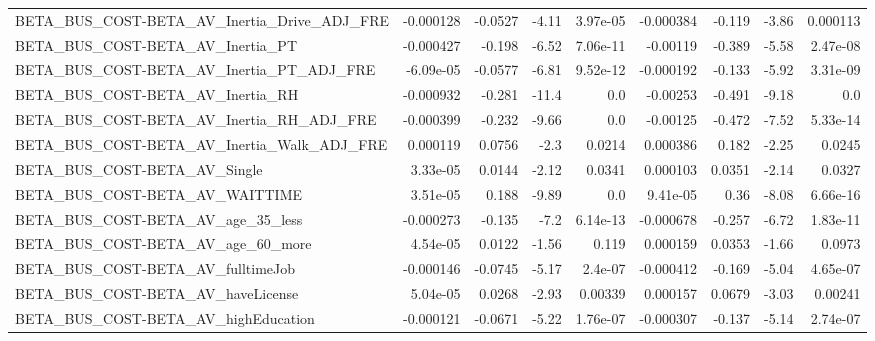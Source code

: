\begin{tabular}{lrrrrrrrr}
BETA\_BUS\_COST-BETA\_AV\_Inertia\_Drive\_ADJ\_FRE        &   -0.000128 &      -0.0527 &    -4.11 & 3.97e-05 &  -0.000384 &      -0.119 &        -3.86 &      0.000113 \\
BETA\_BUS\_COST-BETA\_AV\_Inertia\_PT                   &   -0.000427 &       -0.198 &    -6.52 & 7.06e-11 &   -0.00119 &      -0.389 &        -5.58 &      2.47e-08 \\
BETA\_BUS\_COST-BETA\_AV\_Inertia\_PT\_ADJ\_FRE           &   -6.09e-05 &      -0.0577 &    -6.81 & 9.52e-12 &  -0.000192 &      -0.133 &        -5.92 &      3.31e-09 \\
BETA\_BUS\_COST-BETA\_AV\_Inertia\_RH                   &   -0.000932 &       -0.281 &    -11.4 &      0.0 &   -0.00253 &      -0.491 &        -9.18 &           0.0 \\
BETA\_BUS\_COST-BETA\_AV\_Inertia\_RH\_ADJ\_FRE           &   -0.000399 &       -0.232 &    -9.66 &      0.0 &   -0.00125 &      -0.472 &        -7.52 &      5.33e-14 \\
BETA\_BUS\_COST-BETA\_AV\_Inertia\_Walk\_ADJ\_FRE         &    0.000119 &       0.0756 &     -2.3 &   0.0214 &   0.000386 &       0.182 &        -2.25 &        0.0245 \\
BETA\_BUS\_COST-BETA\_AV\_Single                       &    3.33e-05 &       0.0144 &    -2.12 &   0.0341 &   0.000103 &      0.0351 &        -2.14 &        0.0327 \\
BETA\_BUS\_COST-BETA\_AV\_WAITTIME                     &    3.51e-05 &        0.188 &    -9.89 &      0.0 &   9.41e-05 &        0.36 &        -8.08 &      6.66e-16 \\
BETA\_BUS\_COST-BETA\_AV\_age\_35\_less                  &   -0.000273 &       -0.135 &     -7.2 & 6.14e-13 &  -0.000678 &      -0.257 &        -6.72 &      1.83e-11 \\
BETA\_BUS\_COST-BETA\_AV\_age\_60\_more                  &    4.54e-05 &       0.0122 &    -1.56 &    0.119 &   0.000159 &      0.0353 &        -1.66 &        0.0973 \\
BETA\_BUS\_COST-BETA\_AV\_fulltimeJob                  &   -0.000146 &      -0.0745 &    -5.17 &  2.4e-07 &  -0.000412 &      -0.169 &        -5.04 &      4.65e-07 \\
BETA\_BUS\_COST-BETA\_AV\_haveLicense                  &    5.04e-05 &       0.0268 &    -2.93 &  0.00339 &   0.000157 &      0.0679 &        -3.03 &       0.00241 \\
BETA\_BUS\_COST-BETA\_AV\_highEducation                &   -0.000121 &      -0.0671 &    -5.22 & 1.76e-07 &  -0.000307 &      -0.137 &        -5.14 &      2.74e-07 \\

\end{tabular}
